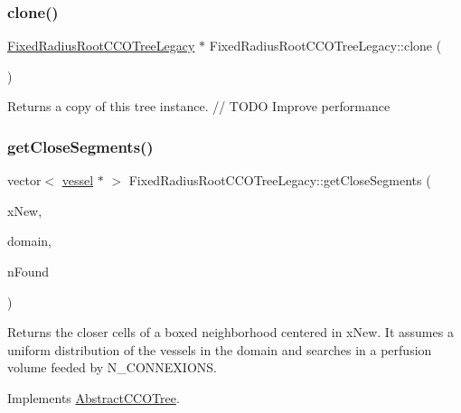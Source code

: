 \subsubsection{\texorpdfstring{clone()}{clone()}}
{\footnotesize\ttfamily \mbox{\hyperlink{class_fixed_radius_root_c_c_o_tree_legacy}{Fixed\+Radius\+Root\+C\+C\+O\+Tree\+Legacy}} $\ast$ Fixed\+Radius\+Root\+C\+C\+O\+Tree\+Legacy\+::clone (\begin{DoxyParamCaption}{ }\end{DoxyParamCaption})}

Returns a copy of this tree instance. // T\+O\+DO Improve performance \mbox{\label{class_fixed_radius_root_c_c_o_tree_legacy_affd26c5ca4319ea7f207e4eb1bfea6b1}} 
\subsubsection{\texorpdfstring{get\+Close\+Segments()}{getCloseSegments()}}
{\footnotesize\ttfamily vector$<$ \mbox{\hyperlink{structvessel}{vessel}} $\ast$ $>$ Fixed\+Radius\+Root\+C\+C\+O\+Tree\+Legacy\+::get\+Close\+Segments (\begin{DoxyParamCaption}\item[{\mbox{\hyperlink{structpoint}{point}}}]{x\+New,  }\item[{\mbox{\hyperlink{class_abstract_domain}{Abstract\+Domain}} $\ast$}]{domain,  }\item[{int $\ast$}]{n\+Found }\end{DoxyParamCaption})\hspace{0.3cm}{\ttfamily [virtual]}}

Returns the closer cells of a boxed neighborhood centered in x\+New. It assumes a uniform distribution of the vessels in the domain and searches in a perfusion volume feeded by N\+\_\+\+C\+O\+N\+N\+E\+X\+I\+O\+NS. 

Implements \mbox{\hyperlink{class_abstract_c_c_o_tree}{Abstract\+C\+C\+O\+Tree}}.

\mbox{\label{class_fixed_radius_root_c_c_o_tree_legacy_a0de200e3f10bdd9c2fc4e3c1f37334e1}} 
